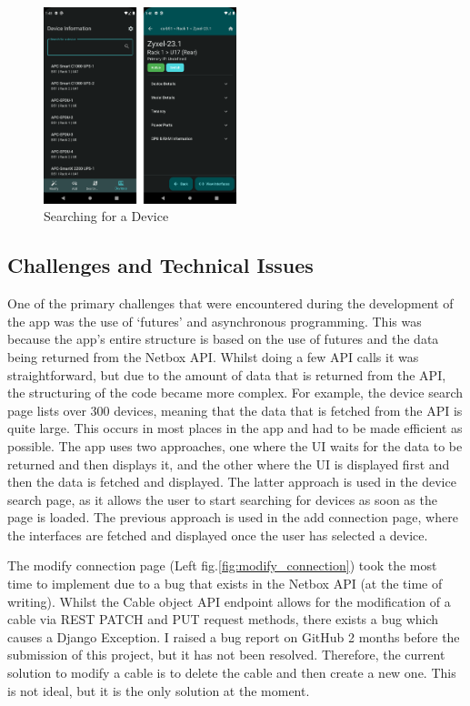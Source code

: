 \documentclass [11pt,a4paper]{article}
\begin{document}
\begin{figure}[H]
    \centering
    \includegraphics[width=0.5\textwidth]{images/final_device.png}
    \caption{Searching for a Device}
    \label{fig:device_searhc_and_view}
\end{figure}

\subsection{Challenges and Technical Issues}
\label{sec:challenges}

One of the primary challenges that were encountered during the development of the app was the use of `futures' and asynchronous programming. This was because the app's entire structure is based on the use of futures and the data being returned from the Netbox API. Whilst doing a few API calls it was straightforward, but due to the amount of data that is returned from the API, the structuring of the code became more complex. For example, the device search page lists over 300 devices, meaning that the data that is fetched from the API is quite large. This occurs in most places in the app and had to be made efficient as possible. The app uses two approaches, one where the UI waits for the data to be returned and then displays it, and the other where the UI is displayed first and then the data is fetched and displayed. The latter approach is used in the device search page, as it allows the user to start searching for devices as soon as the page is loaded. The previous approach is used in the add connection page, where the interfaces are fetched and displayed once the user has selected a device. 

The modify connection page (Left fig.\ref{fig:modify_connection}) took the most time to implement due to a bug that exists in the Netbox API (at the time of writing). Whilst the Cable object API endpoint allows for the modification of a cable via REST PATCH and PUT request methods, there exists a bug which causes a Django Exception. I raised a bug report on GitHub \cite{netboxBug} 2 months before the submission of this project, but it has not been resolved. Therefore, the current solution to modify a cable is to delete the cable and then create a new one. This is not ideal, but it is the only solution at the moment. 
\end{document}
